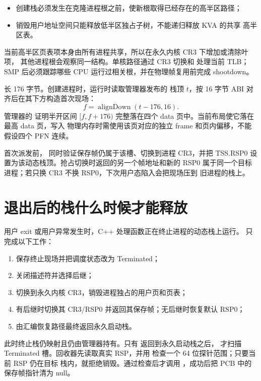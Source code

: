 \begin{itemize}
  \item 创建栈必须发生在克隆进程根之前，使新根取得已经存在的高半区路径；
  \item 销毁用户地址空间只能释放低半区独占子树，不能递归释放 KVA 的共享
        高半区表。
\end{itemize}

当前高半区页表项本身由所有进程共享，所以在永久内核 CR3 下增加或清除叶项，
其他进程根会观察同一结构。单核路径通过 CR3 切换和  处理当前
TLB；SMP 后必须跟踪哪些 CPU 运行过相关根，并在物理帧复用前完成 shootdown。

 长 176 字节。创建进程时，运行时读取管理器发布的
栈顶 \(t\)，按 16 字节 ABI 对齐后在其下方构造首次现场：
\[
  f=\operatorname{alignDown}(t-176,16).
\]
管理器的  证明半开区间
\([f,f+176)\) 完整落在四个 data 页中。当前布局使它落在最高 data 页，写入
物理内存时需使用该页对应的独立 frame 和页内偏移，不能假设四个 PFN 连续。

首次派发前， 同时验证保存帧仍属于该槽、切换到进程
CR3，并把 TSS.RSP0 设置为该动态栈顶。抢占切换时返回的另一个帧地址和新的
RSP0 属于同一个目标进程；若只换 CR3 不换 RSP0，下次用户态陷入会把现场压到
旧进程的栈上。

\section{退出后的栈什么时候才能释放}
用户 exit 或用户异常发生时，C++ 处理函数正在终止进程的动态栈上运行。
 只完成以下工作：

\begin{enumerate}[label=\arabic*.]
  \item 保存终止现场并把调度状态改为 Terminated；
  \item 关闭描述符并选择后继；
  \item 切换到永久内核 CR3，销毁进程独占的用户页和页表；
  \item 有后继时切换其 CR3/RSP0 并返回其保存帧；无后继时恢复默认 RSP0；
  \item 由汇编恢复路径最终返回永久启动栈。
\end{enumerate}

此时终止栈仍映射且仍由管理器持有。只有
 返回到永久启动栈之后，
 才扫描 Terminated 槽。回收器先读取真实
RSP，并用  检查一个 64 位探针范围；只要当前 RSP 仍在目标
栈内，就拒绝销毁。通过检查后才调用 ，成功后把 PCB 中的
保存帧指针清为 null。

